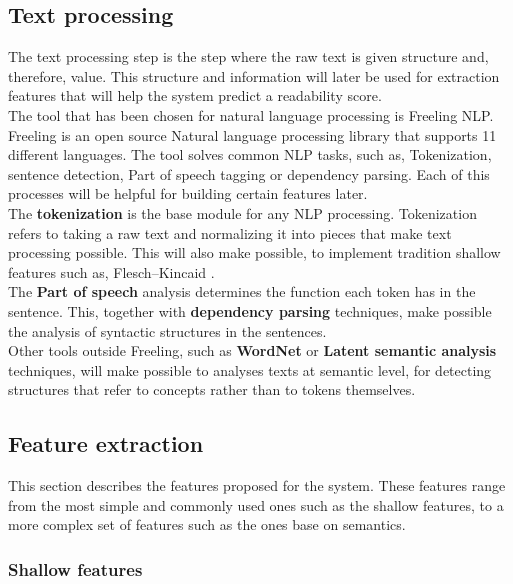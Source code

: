\documentclass[12pt]{article}
\begin{document}
\subsection{Text processing}

The text processing step is the step where the raw text is given structure and, therefore, value. This structure and information will later be used for extraction features that will help the system predict a readability score.\\

The tool that has been chosen for natural language processing is Freeling NLP\cite{freelingNLP}. Freeling is an open source Natural language processing library that supports 11 different languages. The tool solves common NLP tasks, such as, Tokenization, sentence detection, Part of speech tagging or dependency parsing. Each of this processes will be helpful for building certain features later.\\

The \textbf{tokenization} is the base module for any NLP processing. Tokenization refers to taking a raw text and normalizing it into pieces that make text processing possible. This will also make possible, to implement tradition shallow features such as, Flesch–Kincaid \cite{flesch}. \\

The \textbf{Part of speech} analysis determines the function each token has in the sentence. This, together with \textbf{dependency parsing} techniques, make possible the analysis of syntactic structures in the sentences.\\

Other tools outside Freeling, such as \textbf{WordNet} or \textbf{Latent semantic analysis} techniques, will make possible to analyses texts at semantic level, for detecting structures that refer to concepts rather than to tokens themselves.\\


\subsection{Feature extraction}
This section describes the features proposed for the system. These features range from the most simple and commonly used ones such as the shallow features, to a more complex set of features such as the ones base on semantics.

\subsubsection*{Shallow features}
\end{document}
